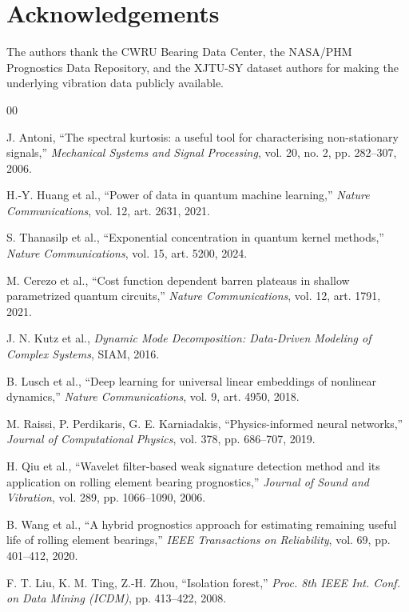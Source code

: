 \documentclass[3p,times,procedia]{elsarticle}
\begin{document}
\section*{Acknowledgements}
The authors thank the CWRU Bearing Data Center, the NASA/PHM Prognostics Data Repository, and the XJTU-SY dataset authors for making the underlying vibration data publicly available.


\begin{thebibliography}{00}

J. Antoni, ``The spectral kurtosis: a useful tool for characterising non-stationary signals,'' \textit{Mechanical Systems and Signal Processing}, vol. 20, no. 2, pp. 282--307, 2006.

H.-Y. Huang et al., ``Power of data in quantum machine learning,'' \textit{Nature Communications}, vol. 12, art. 2631, 2021.

S. Thanasilp et al., ``Exponential concentration in quantum kernel methods,'' \textit{Nature Communications}, vol. 15, art. 5200, 2024.

M. Cerezo et al., ``Cost function dependent barren plateaus in shallow parametrized quantum circuits,'' \textit{Nature Communications}, vol. 12, art. 1791, 2021.

J. N. Kutz et al., \textit{Dynamic Mode Decomposition: Data-Driven Modeling of Complex Systems}, SIAM, 2016.

B. Lusch et al., ``Deep learning for universal linear embeddings of nonlinear dynamics,'' \textit{Nature Communications}, vol. 9, art. 4950, 2018.

M. Raissi, P. Perdikaris, G. E. Karniadakis, ``Physics-informed neural networks,'' \textit{Journal of Computational Physics}, vol. 378, pp. 686--707, 2019.

H. Qiu et al., ``Wavelet filter-based weak signature detection method and its application on rolling element bearing prognostics,'' \textit{Journal of Sound and Vibration}, vol. 289, pp. 1066--1090, 2006.

B. Wang et al., ``A hybrid prognostics approach for estimating remaining useful life of rolling element bearings,'' \textit{IEEE Transactions on Reliability}, vol. 69, pp. 401--412, 2020.

F. T. Liu, K. M. Ting, Z.-H. Zhou, ``Isolation forest,'' \textit{Proc. 8th IEEE Int. Conf. on Data Mining (ICDM)}, pp. 413--422, 2008.


\end{thebibliography}
\end{document}
